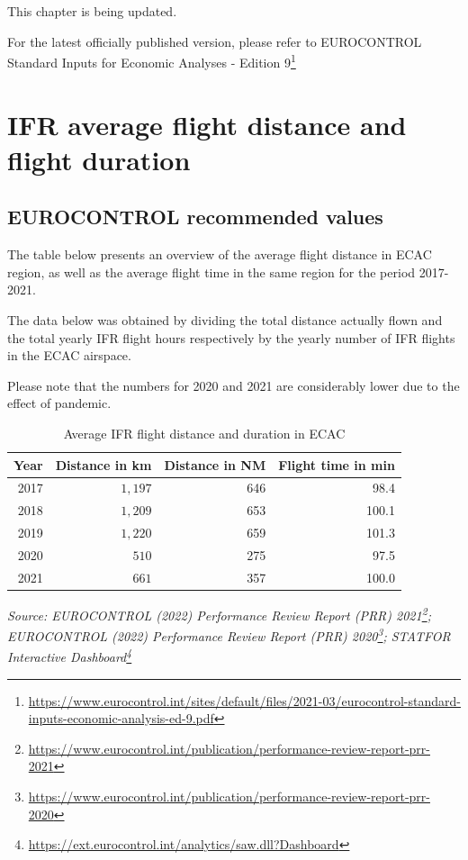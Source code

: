 \documentclass[
  11pt,
  a4paper,
]{book}
\DeclareRobustCommand{\href}[2]{#2\footnote{\url{#1}}}
\begin{document}
This chapter is being updated.

For the latest officially published version, please refer to
\href{https://www.eurocontrol.int/sites/default/files/2021-03/eurocontrol-standard-inputs-economic-analysis-ed-9.pdf}{EUROCONTROL
Standard Inputs for Economic Analyses - Edition 9}

\hypertarget{sec-if-average-flight-distance-and-flight-duration}{%
\chapter{IFR average flight distance and flight
duration}\label{sec-if-average-flight-distance-and-flight-duration}}

\hypertarget{eurocontrol-recommended-values-8}{%
\section{EUROCONTROL recommended
values}\label{eurocontrol-recommended-values-8}}

The table below presents an overview of the average flight distance in
ECAC region, as well as the average flight time in the same region for
the period 2017-2021.

The data below was obtained by dividing the total distance actually
flown and the total yearly IFR flight hours respectively by the yearly
number of IFR flights in the ECAC airspace.

Please note that the numbers for 2020 and 2021 are considerably lower
due to the effect of pandemic.

\hypertarget{tbl-avg-flight-distance-duration}{}
\setlength{\LTpost}{0mm}
\begin{longtable}{rrrr}
\caption{\label{tbl-avg-flight-distance-duration}Average IFR flight distance and duration in ECAC }\tabularnewline

\toprule
Year & Distance in km & Distance in NM & Flight time in min \\ 
\midrule
2017 & $1,197$ & 646 & 98.4 \\ 
2018 & $1,209$ & 653 & 100.1 \\ 
2019 & $1,220$ & 659 & 101.3 \\ 
2020 & $510$ & 275 & 97.5 \\ 
2021 & $661$ & 357 & 100.0 \\ 
\bottomrule
\end{longtable}
\begin{minipage}{\linewidth}
\emph{Source: \href{https://www.eurocontrol.int/publication/performance-review-report-prr-2021}{EUROCONTROL (2022) Performance Review Report (PRR) 2021}; \href{https://www.eurocontrol.int/publication/performance-review-report-prr-2020}{EUROCONTROL (2022) Performance Review Report (PRR) 2020}; \href{https://ext.eurocontrol.int/analytics/saw.dll?Dashboard}{STATFOR Interactive Dashboard}}\\
\end{minipage}
\end{document}

